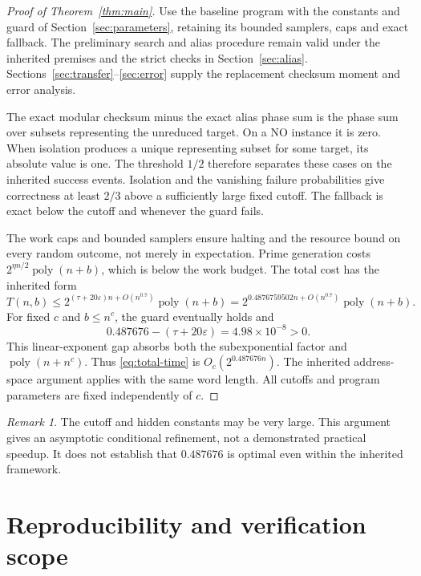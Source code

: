 \documentclass[11pt,a4paper]{article}
\theoremstyle{remark}
\newtheorem*{remark}{Remark}
\newcommand{\poly}{\operatorname{poly}}
\newcommand{\eps}{\varepsilon}
\begin{document}
\begin{proof}[Proof of Theorem~\ref{thm:main}]
Use the baseline program with the constants and guard of
Section~\ref{sec:parameters}, retaining its bounded samplers, caps and
exact fallback. The preliminary search and alias procedure remain valid
under the inherited premises and the strict checks in
Section~\ref{sec:alias}. Sections~\ref{sec:transfer}--\ref{sec:error}
supply the replacement checksum moment and error analysis.

The exact modular checksum minus the exact alias phase sum is the phase
sum over subsets representing the unreduced target. On a NO instance
it is zero. When isolation produces a unique representing subset for
some target, its absolute value is one. The threshold $1/2$ therefore
separates these cases on the inherited success events. Isolation and
the vanishing failure probabilities give correctness at least $2/3$
above a sufficiently large fixed cutoff. The fallback is exact below
the cutoff and whenever the guard fails.

The work caps and bounded samplers ensure halting and the resource bound
on every random outcome, not merely in expectation. Prime generation
costs $2^{\eta n/2}\poly(n+b)$, which is below the work budget. The total
cost has the inherited form
\begin{equation}
\label{eq:total-time}
 T(n,b)\le
 2^{(\tau+20\eps)n+O(n^{0.7})}\poly(n+b)
 =2^{0.4876759502n+O(n^{0.7})}\poly(n+b).
\end{equation}
For fixed $c$ and $b\le n^c$, the guard eventually holds and
\[
 0.487676-(\tau+20\eps)=4.98\times10^{-8}>0.
\]
This linear-exponent gap absorbs both the subexponential factor and
$\poly(n+n^c)$. Thus \eqref{eq:total-time} is
$O_c(2^{0.487676n})$. The inherited address-space argument applies with
the same word length. All cutoffs and program parameters are fixed
independently of $c$.
\end{proof}

\begin{remark}
The cutoff and hidden constants may be very large. This argument gives
an asymptotic conditional refinement, not a demonstrated practical
speedup. It does not establish that $0.487676$ is optimal even within
the inherited framework.
\end{remark}

\section{Reproducibility and verification scope}
\label{sec:verification}
\end{document}
